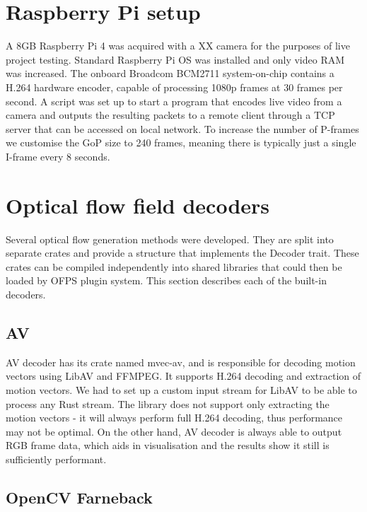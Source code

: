 \documentclass[11pt,english]{report}
\begin{document}
\section{Raspberry Pi setup}

A 8GB Raspberry Pi 4 was acquired with a XX camera for the purposes of live project testing. Standard Raspberry Pi OS was installed and only video RAM was increased. The onboard Broadcom BCM2711 system-on-chip contains a H.264 hardware encoder, capable of processing 1080p frames at 30 frames per second. A script was set up to start a program that encodes live video from a camera and outputs the resulting packets to a remote client through a TCP server that can be accessed on local network. To increase the number of P-frames we customise the GoP size to 240 frames, meaning there is typically just a single I-frame every 8 seconds.

\section{Optical flow field decoders}

Several optical flow generation methods were developed. They are split into separate crates and provide a structure that implements the Decoder trait. These crates can be compiled independently into shared libraries that could then be loaded by OFPS plugin system. This section describes each of the built-in decoders.

\subsection{AV}

AV decoder has its crate named mvec-av, and is responsible for decoding motion vectors using LibAV and FFMPEG. It supports H.264 decoding and extraction of motion vectors. We had to set up a custom input stream for LibAV to be able to process any Rust stream. The library does not support only extracting the motion vectors - it will always perform full H.264 decoding, thus performance may not be optimal. On the other hand, AV decoder is always able to output RGB frame data, which aids in visualisation and the results show it still is sufficiently performant.

\subsection{OpenCV Farneback}
\end{document}
